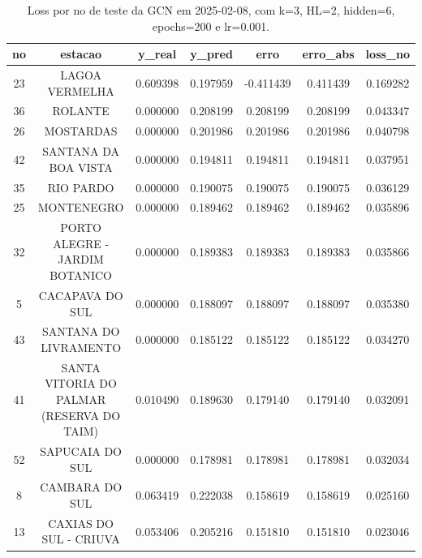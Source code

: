 \begin{table}[h]
\centering
\caption{Loss por no de teste da GCN em 2025-02-08, com k=3, HL=2, hidden=6, epochs=200 e lr=0.001.}
\label{tab:gcn_loss_k3_hl2_h6_e200_d20250208}
\begin{tabular}{ccccccc}
\toprule
no & estacao & y\_real & y\_pred & erro & erro\_abs & loss\_no \\
\midrule
23 & LAGOA VERMELHA & 0.609398 & 0.197959 & -0.411439 & 0.411439 & 0.169282 \\
36 & ROLANTE & 0.000000 & 0.208199 & 0.208199 & 0.208199 & 0.043347 \\
26 & MOSTARDAS & 0.000000 & 0.201986 & 0.201986 & 0.201986 & 0.040798 \\
42 & SANTANA DA BOA VISTA & 0.000000 & 0.194811 & 0.194811 & 0.194811 & 0.037951 \\
35 & RIO PARDO & 0.000000 & 0.190075 & 0.190075 & 0.190075 & 0.036129 \\
25 & MONTENEGRO & 0.000000 & 0.189462 & 0.189462 & 0.189462 & 0.035896 \\
32 & PORTO ALEGRE - JARDIM BOTANICO & 0.000000 & 0.189383 & 0.189383 & 0.189383 & 0.035866 \\
5 & CACAPAVA DO SUL & 0.000000 & 0.188097 & 0.188097 & 0.188097 & 0.035380 \\
43 & SANTANA DO LIVRAMENTO & 0.000000 & 0.185122 & 0.185122 & 0.185122 & 0.034270 \\
41 & SANTA VITORIA DO PALMAR (RESERVA DO TAIM) & 0.010490 & 0.189630 & 0.179140 & 0.179140 & 0.032091 \\
52 & SAPUCAIA DO SUL & 0.000000 & 0.178981 & 0.178981 & 0.178981 & 0.032034 \\
8 & CAMBARA DO SUL & 0.063419 & 0.222038 & 0.158619 & 0.158619 & 0.025160 \\
13 & CAXIAS DO SUL - CRIUVA & 0.053406 & 0.205216 & 0.151810 & 0.151810 & 0.023046 \\
\bottomrule
\end{tabular}
\end{table}
